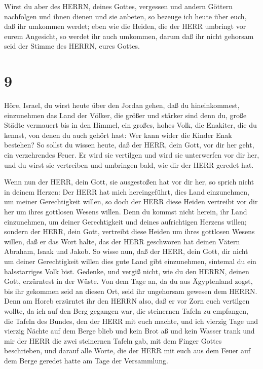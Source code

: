  Wirst du aber des HERRN, deines Gottes, vergessen und
andern Göttern nachfolgen und ihnen dienen und sie anbeten, so bezeuge
ich heute über euch, daß ihr umkommen werdet;  eben wie die
Heiden, die der HERR umbringt vor eurem Angesicht, so werdet ihr auch
umkommen, darum daß ihr nicht gehorsam seid der Stimme des HERRN, eures
Gottes.

\hypertarget{section-8}{%
\section{9}\label{section-8}}

 Höre, Israel, du wirst heute über den Jordan gehen, daß du
hineinkommest, einzunehmen das Land der Völker, die größer und stärker
sind denn du, große Städte vermauert bis in den Himmel,  ein
großes, hohes Volk, die Enakiter, die du kennst, von denen du auch
gehört hast: Wer kann wider die Kinder Enak bestehen?  So
sollst du wissen heute, daß der HERR, dein Gott, vor dir her geht, ein
verzehrendes Feuer. Er wird sie vertilgen und wird sie unterwerfen vor
dir her, und du wirst sie vertreiben und umbringen bald, wie dir der
HERR geredet hat.

 Wenn nun der HERR, dein Gott, sie ausgestoßen hat vor dir
her, so sprich nicht in deinem Herzen: Der HERR hat mich hereingeführt,
dies Land einzunehmen, um meiner Gerechtigkeit willen, so doch der HERR
diese Heiden vertreibt vor dir her um ihres gottlosen Wesens willen.
 Denn du kommst nicht herein, ihr Land einzunehmen, um
deiner Gerechtigkeit und deines aufrichtigen Herzens willen; sondern der
HERR, dein Gott, vertreibt diese Heiden um ihres gottlosen Wesens
willen, daß er das Wort halte, das der HERR geschworen hat deinen Vätern
Abraham, Isaak und Jakob.  So wisse nun, daß der HERR, dein
Gott, dir nicht um deiner Gerechtigkeit willen dies gute Land gibt
einzunehmen, sintemal du ein halsstarriges Volk bist. 
Gedenke, und vergiß nicht, wie du den HERRN, deinen Gott, erzürntest in
der Wüste. Von dem Tage an, da du aus Ägyptenland zogst, bis ihr
gekommen seid an diesen Ort, seid ihr ungehorsam gewesen dem HERRN.
 Denn am Horeb erzürntet ihr den HERRN also, daß er vor Zorn
euch vertilgen wollte,  da ich auf den Berg gegangen war,
die steinernen Tafeln zu empfangen, die Tafeln des Bundes, den der HERR
mit euch machte, und ich vierzig Tage und vierzig Nächte auf dem Berge
blieb und kein Brot aß und kein Wasser trank  und mir der
HERR die zwei steinernen Tafeln gab, mit dem Finger Gottes beschrieben,
und darauf alle Worte, die der HERR mit euch aus dem Feuer auf dem Berge
geredet hatte am Tage der Versammlung.


